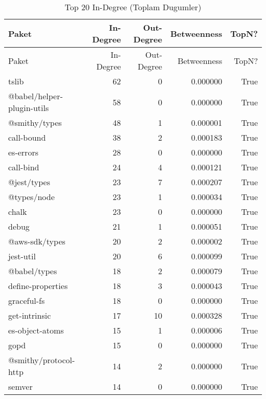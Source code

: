 \begin{longtable}{lrrrr}
\caption{Top 20 In-Degree (Toplam Dugumler)}\\
\toprule
Paket & In-Degree & Out-Degree & Betweenness & TopN? \\
\midrule
\endfirsthead
\toprule
Paket & In-Degree & Out-Degree & Betweenness & TopN? \\
\midrule
\endhead
\bottomrule
\endfoot
\bottomrule
\endlastfoot
tslib & 62 & 0 & 0.000000 & True \\
@babel/helper-plugin-utils & 58 & 0 & 0.000000 & True \\
@smithy/types & 48 & 1 & 0.000001 & True \\
call-bound & 38 & 2 & 0.000183 & True \\
es-errors & 28 & 0 & 0.000000 & True \\
call-bind & 24 & 4 & 0.000121 & True \\
@jest/types & 23 & 7 & 0.000207 & True \\
@types/node & 23 & 1 & 0.000034 & True \\
chalk & 23 & 0 & 0.000000 & True \\
debug & 21 & 1 & 0.000051 & True \\
@aws-sdk/types & 20 & 2 & 0.000002 & True \\
jest-util & 20 & 6 & 0.000099 & True \\
@babel/types & 18 & 2 & 0.000079 & True \\
define-properties & 18 & 3 & 0.000043 & True \\
graceful-fs & 18 & 0 & 0.000000 & True \\
get-intrinsic & 17 & 10 & 0.000328 & True \\
es-object-atoms & 15 & 1 & 0.000006 & True \\
gopd & 15 & 0 & 0.000000 & True \\
@smithy/protocol-http & 14 & 2 & 0.000000 & True \\
semver & 14 & 0 & 0.000000 & True \\
\end{longtable}
